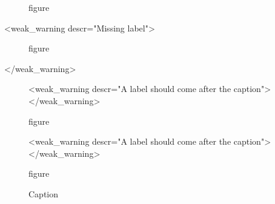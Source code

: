\documentclass{article}
\begin{document}
    \begin{figure}
        \caption{figure}
        \label{fig:good-label}
    \end{figure}

    <weak_warning descr="Missing label">\begin{figure}
        \caption{figure}
    \end{figure}</weak_warning>

    \begin{figure}
        <weak_warning descr="A label should come after the caption">\label{fig:wrong-label}</weak_warning>
        \caption{figure}
    \end{figure}

    \begin{figure}
        <weak_warning descr="A label should come after the caption">\label{fig:wrong-label2}</weak_warning>\caption{figure}
    \end{figure}

    \begin{figure}[ht]
        \centering
        \caption{Caption}\label{fig:figure}
    \end{figure}
\end{document}
